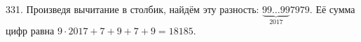 331. Произведя вычитание в столбик, найдём эту разность: $\underbrace{99\ldots99}_{2017}7979.$ Её сумма цифр равна $9\cdot2017+7+9+7+9=18185.$\\
